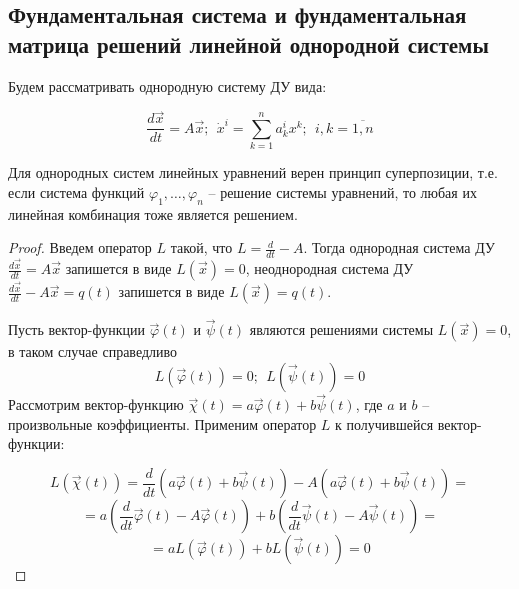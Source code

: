 \subsection{Фундаментальная система и фундаментальная матрица решений линейной однородной
системы}

Будем рассматривать однородную систему ДУ вида:

\begin{equation}
    \frac{d \vec x}{dt} = A \vec x; ~~ \dot x^i = \sum^n_{k = 1} a^i_k x^k; ~~ i, k = \overline{1, n} 
\end{equation}

\begin{proposition}
    Для однородных систем линейных уравнений верен принцип суперпозиции, т.е. если
    система функций $\varphi_1, \dots, \varphi_n$ -- решение системы уравнений, то любая их линейная комбинация тоже
    является решением.
\end{proposition}
\begin{proof}
    Введем оператор $L$ такой, что $L = \frac{d}{dt} - A$. Тогда однородная система ДУ $\frac{d \vec x}{dt} = A \vec x$ запишется в виде
    $L(\vec x) = 0$, неоднородная система ДУ $\frac{d \vec x}{dt} - A \vec x = q(t)$ запишется в виде $L(\vec x) = q(t)$.
    
    Пусть вектор-функции $\vec{\varphi}(t)$ и $\vec{\psi}(t)$ являются решениями системы $L(\vec x) = 0$, в таком случае справедливо
    \[ L(\vec{\varphi}(t)) = 0; ~~ L(\vec{\psi}(t)) = 0 \]
    Рассмотрим вектор-функцию $\vec{\chi}(t) = a \vec{\varphi}(t) + b \vec{\psi}(t)$, где $a$ и $b$ --  произвольные коэффициенты. Применим оператор $L$ к получившейся вектор-функции:
    
    \[ L(\vec{\chi}(t)) = \frac{d}{dt} \left(a \vec{\varphi}(t) + b \vec{\psi}(t) \right) - A \left(a \vec{\varphi}(t) + b \vec{\psi}(t) \right) = \]
    \[ = a \left(\frac{d}{dt} \vec{\varphi}(t) - A \vec{\varphi}(t) \right) + b \left(\frac{d}{dt} \vec{\psi}(t) - A \vec{\psi}(t) \right) = \]
    \[ = a L(\vec{\varphi}(t)) + b L(\vec{\psi}(t)) = 0 \]
    
\end{proof}

